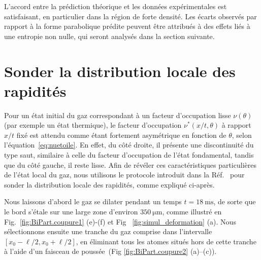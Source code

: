 L’accord entre la prédiction théorique et les données expérimentales est satisfaisant, en particulier dans la région de forte densité. Les écarts observés par rapport à la forme parabolique prédite peuvent être attribués à des effets liés à une entropie non nulle, qui seront analysés dans la section suivante.

\section{Sonder la distribution locale des rapidités}
\label{sec:local}

Pour un état initial du gaz correspondant à un facteur d'occupation lisse $\nu(\theta)$ (par exemple un état thermique), le facteur d'occupation $\nu^*(x/t,\theta)$ à rapport $x/t$ fixé est attendu comme étant fortement asymétrique en fonction de $\theta$, selon l'équation~\eqref{eq:nuetoile}. En effet, du côté droite, il présente une discontinuité du type saut, similaire à celle du facteur d'occupation de l’état fondamental, tandis que du côté gauche, il reste lisse. Afin de révéler ces caractéristiques particulières de l’état local du gaz, nous utilisons le protocole introduit dans la Réf.~\cite{dubois_probing_2024} pour sonder la distribution locale des rapidités, comme expliqué ci-après.

Nous laissons d’abord le gaz se dilater pendant un temps $t=18~\mathrm{ms}$, de sorte que le bord s’étale sur une large zone d’environ $350~\mathrm{\mu m}$, comme illustré en Fig.~\ref{fig:BiPart.coupure1} (e)-(f) et  Fig ~\ref{fig:simul_deformation} (a).  
Nous sélectionnons ensuite une tranche du gaz comprise dans l’intervalle $[x_0-\ell/2, x_0+\ell/2]$, en éliminant tous les atomes situés hors de cette tranche à l’aide d’un faisceau de poussée~\cite{dubois_probing_2024}(Fig \ref{fig:BiPart.coupure2} (a)--(c)). 

